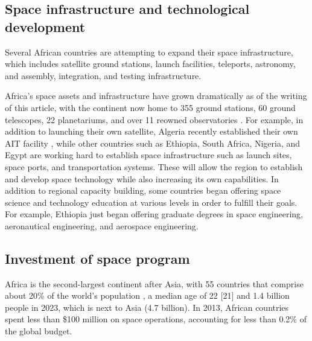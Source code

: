\documentclass[final,5p,times, twocolumn, sort&compress, sc]{elsarticle}
\begin{document}
\subsection{\textbf{Space infrastructure and technological development}}
Several African countries are attempting to expand their space infrastructure, which includes satellite ground stations, launch facilities, teleports, astronomy, and assembly, integration, and testing infrastructure. 

Africa's space assets and infrastructure have grown dramatically as of the writing of this article, with the continent now home to 355 ground stations, 60 ground telescopes, 22 planetariums, and over 11 reowned observatories \cite{sa2023}. For example, in addition to launching their own satellite, Algeria recently established their own AIT facility \cite{momoh2008overview}, while other countries such as Ethiopia, South Africa, Nigeria, and Egypt are working hard to establish space infrastructure such as launch sites, space ports, and transportation systems. 
These will allow the region to establish and develop space technology while also increasing its own capabilities. In addition to regional capacity building, some countries began offering space science and technology education at various levels in order to fulfill their goals. For example, Ethiopia just began offering graduate degrees in space engineering, aeronautical engineering, and aerospace engineering. 

\subsection{Investment of space program}
Africa is the second-largest continent after Asia, with 55 countries that comprise about 20\% of the world's population , a median age of 22 [21] and 1.4 billion people in 2023, which is next to Asia (4.7 billion). In 2013, African countries spent less than \$100 million \cite{union2017african} on space operations, accounting for less than 0.2\% of the global budget. 
\end{document}
